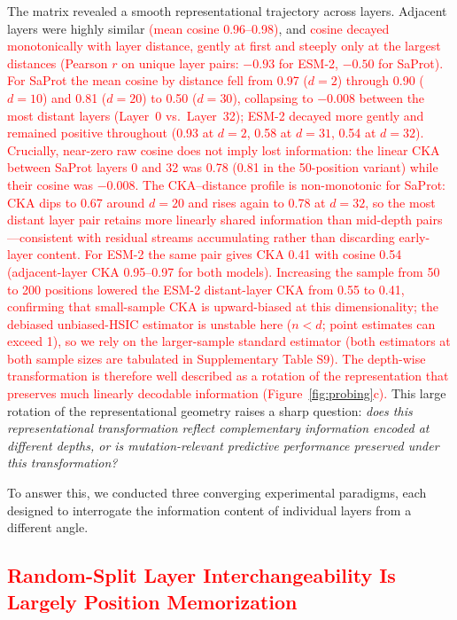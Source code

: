 \documentclass[numbered,webpdf,modern,large]{oup-authoring-template}
\newcommand{\rev}[1]{\textcolor{red}{#1}}
\begin{document}
The matrix revealed a smooth representational trajectory across layers. Adjacent layers
were highly similar \rev{(mean cosine 0.96--0.98)}, and \rev{cosine decayed
monotonically with layer distance, gently at first and steeply only at the
largest distances (Pearson $r$ on unique layer pairs: $-0.93$ for ESM-2,
$-0.50$ for SaProt). For SaProt the mean cosine by distance fell from 0.97
($d=2$) through 0.90 ($d=10$) and 0.81 ($d=20$) to 0.50 ($d=30$), collapsing to
$-0.008$ between the most distant layers (Layer~0 vs.\ Layer~32); ESM-2 decayed
more gently and remained positive throughout (0.93 at $d=2$, 0.58 at $d=31$,
0.54 at $d=32$). Crucially, near-zero raw cosine does not imply lost
information: the linear CKA between SaProt layers 0 and 32 was 0.78 (0.81 in
the 50-position variant) while their cosine was $-0.008$. The CKA--distance
profile is non-monotonic for SaProt: CKA dips to 0.67 around $d=20$ and rises
again to 0.78 at $d=32$, so the most distant layer pair retains more linearly
shared information than mid-depth pairs---consistent with residual streams
accumulating rather than discarding early-layer content. For ESM-2 the same
pair gives CKA 0.41 with cosine 0.54 (adjacent-layer CKA 0.95--0.97 for both
models). Increasing the sample from 50 to 200 positions lowered the ESM-2
distant-layer CKA from 0.55 to 0.41, confirming that small-sample CKA is
upward-biased at this dimensionality; the debiased unbiased-HSIC estimator is
unstable here ($n < d$; point estimates can exceed 1), so we rely on the
larger-sample standard estimator (both estimators at both sample sizes are
tabulated in Supplementary Table S9). The depth-wise transformation is therefore
well described as a rotation of the representation that preserves much
linearly decodable information (Figure~\ref{fig:probing}c).} This large
rotation of the representational geometry raises a sharp question: \emph{does this
representational transformation reflect complementary information encoded at different
depths, or is mutation-relevant predictive performance preserved under this transformation?}

To answer this, we conducted three converging experimental paradigms, each designed to
interrogate the information content of individual layers from a different angle.

\subsection{\rev{Random-Split Layer Interchangeability Is Largely Position Memorization}}
\end{document}
